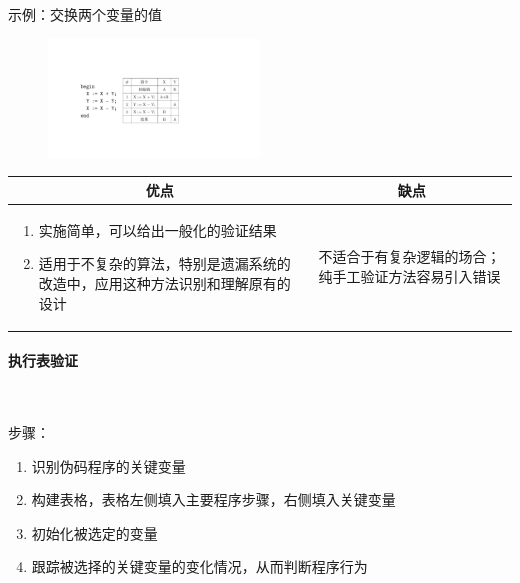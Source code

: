 示例：交换两个变量的值
\begin{figure}[H]
    \vspace{-0.5em}
	\centering
	\includegraphics[width=0.5\textwidth]{images/符号化执行验证示例.pdf}
    \vspace{-1em}
\end{figure}

\vspace{-0.5em}
\begin{spacing}{1.2}
    \centering
    \begin{longtable}{|m{7.2cm}|m{7.2cm}|}
        \hline
        \multicolumn{1}{|c|}{\textbf{优点}} & \multicolumn{1}{c|}{\textbf{缺点}} \\ \hline
        \vspace{-1em}
        \begin{enumerate}[label=\arabic*.,leftmargin=1em]
            \item 实施简单，可以给出一般化的验证结果
            \item 适用于不复杂的算法，特别是遗漏系统的改造中，应用这种方法识别和理解原有的设计
            \vspace{-1.3em}
        \end{enumerate}
        & 不适合于有复杂逻辑的场合；纯手工验证方法容易引入错误
        \\ \hline
    \end{longtable}
	\end{spacing}
\vspace{-1em}

\paragraph{执行表验证}~{} \par
步骤：
\vspace{-0.8em}
\begin{multicols}{2}
    \begin{enumerate}[label=\arabic*.]
        \item 识别伪码程序的关键变量
        \item 构建表格，表格左侧填入主要程序步骤，右侧填入关键变量
        \item 初始化被选定的变量
        \item 跟踪被选择的关键变量的变化情况，从而判断程序行为
    \end{enumerate}
\end{multicols}
\vspace{-1em}


